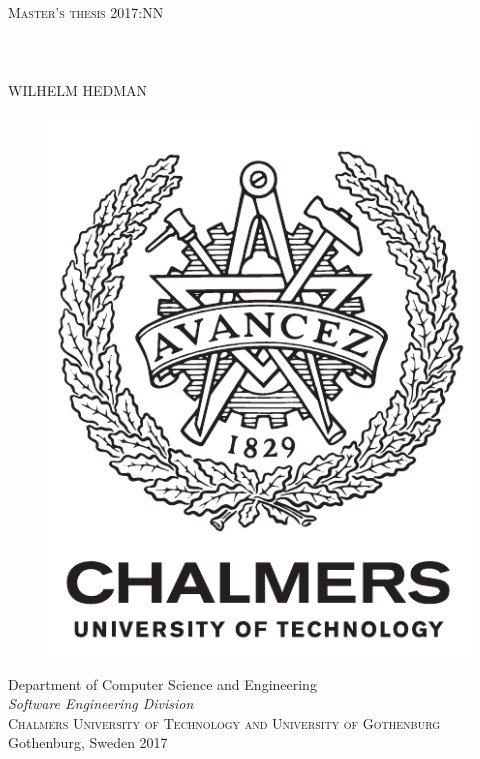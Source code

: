 \newpage
\thispagestyle{empty}
\begin{center}
	\textsc{\large Master's thesis 2017:NN}\\[4cm]		%
	\textbf{\Large \toptitle\\ \bottomtitle} \\[1cm]
	{\large \subt}\\[1cm]
	{\large WILHELM HEDMAN}
	
	\vfill	
	\begin{figure}[H]
	\centering
	\includegraphics[width=0.2\pdfpagewidth]{figure/auxiliary/logo_eng.pdf} \\	
	\end{figure}	\vspace{5mm}	
	
	Department of Computer Science and Engineering \\
	\emph{Software Engineering Division}\\
	\textsc{Chalmers University of Technology and University of Gothenburg} \\
	Gothenburg, Sweden 2017 \\
\end{center}


